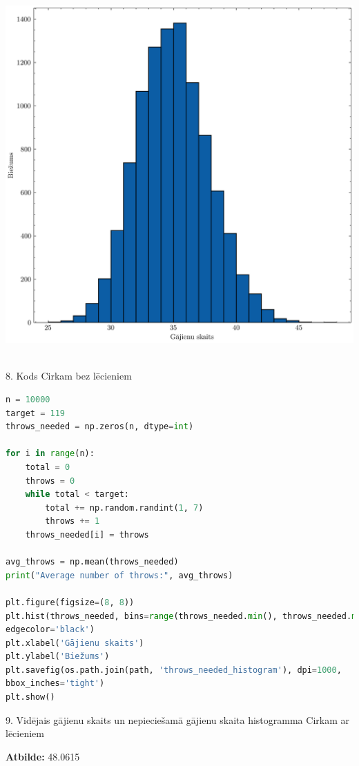 \documentclass[12pt]{article}
\begin{document}
\begin{center}
    \includegraphics[width=0.8\linewidth]{throws_needed_histogram.png}
\end{center}

\\

8. Kods Cirkam bez lēcieniem

\begin{lstlisting}[language=Python]
n = 10000
target = 119
throws_needed = np.zeros(n, dtype=int)

for i in range(n):
    total = 0
    throws = 0
    while total < target:
        total += np.random.randint(1, 7) 
        throws += 1
    throws_needed[i] = throws

avg_throws = np.mean(throws_needed)
print("Average number of throws:", avg_throws)

plt.figure(figsize=(8, 8))
plt.hist(throws_needed, bins=range(throws_needed.min(), throws_needed.max()+2),
edgecolor='black')
plt.xlabel('Gājienu skaits')
plt.ylabel('Biežums')
plt.savefig(os.path.join(path, 'throws_needed_histogram'), dpi=1000,
bbox_inches='tight')
plt.show()
\end{lstlisting}

9. Vidējais gājienu skaits un nepieciešamā gājienu skaita histogramma Cirkam ar lēcieniem

\textbf{Atbilde:} 48.0615
\end{document}
